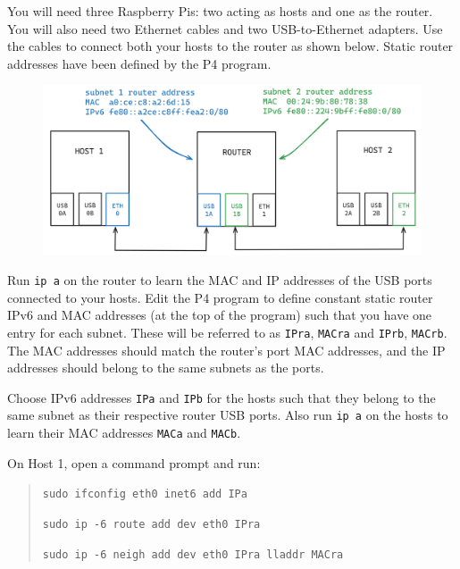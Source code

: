 



You will need three Raspberry Pis: two acting as hosts and one as the router. You will also need two Ethernet cables and two USB-to-Ethernet adapters. Use the cables to connect both your hosts to the router as shown below. Static router addresses have been defined by the P4 program.

\begin{figure}[htbp]
  \centering
    \includegraphics[width=1\textwidth]{figures/appendices/icmpv6_ndp_setup.jpg}
\end{figure}

Run \texttt{ip a} on the router to learn the MAC and IP addresses of the USB ports connected to your hosts. Edit the P4 program to define constant static router IPv6 and MAC addresses (at the top of the program) such that you have one entry for each subnet. These will be referred to as \texttt{IPra}, \texttt{MACra} and \texttt{IPrb}, \texttt{MACrb}. The MAC addresses should match the router’s port MAC addresses, and the IP addresses should belong to the same subnets as the ports. 

Choose IPv6 addresses \texttt{IPa} and \texttt{IPb} for the hosts such that they belong to the same subnet as their respective router USB ports. Also run \texttt{ip a} on the hosts to learn their MAC addresses \texttt{MACa} and \texttt{MACb}.

On Host 1, open a command prompt and run:
\begin{quote}
    \texttt{sudo ifconfig eth0 inet6 add IPa}
    
    \texttt{sudo ip -6 route add dev eth0 IPra}
    
    \texttt{sudo ip -6 neigh add dev eth0 IPra lladdr MACra}
\end{quote}

